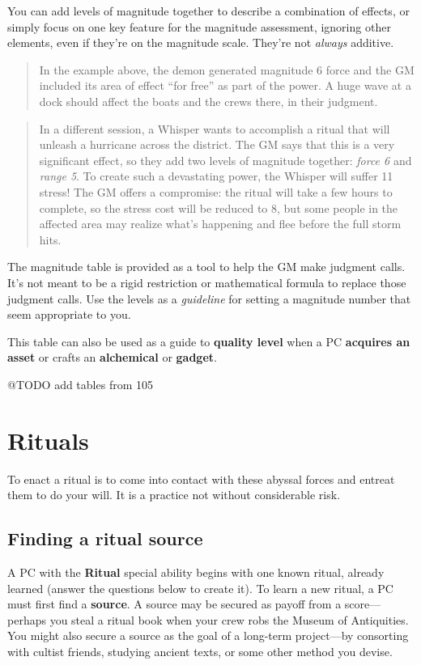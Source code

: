 \documentclass[11pt,oneside]{book}
\newcommand{\gameterm}[1]{\textbf{#1}}
\begin{document}
You can add levels of magnitude together to describe a combination of effects, or simply focus on one key feature for the magnitude assessment, ignoring other elements, even if they’re on the magnitude scale. They’re not \emph{always} additive.

\begin{quote}
	In the example above, the demon generated magnitude 6 force and the GM included its area of effect “for free” as part of the power. A huge wave at a dock should affect the boats and the crews there, in their judgment.
\end{quote} 

\begin{quote}
	In a different session, a Whisper wants to accomplish a ritual that will unleash a hurricane across the district. The GM says that this is a very significant effect, so they add two levels of magnitude together: \emph{force 6} and \emph{range 5}. To create such a devastating power, the Whisper will suffer 11 stress! The GM offers a compromise: the ritual will take a few hours to complete, so the stress cost will be reduced to 8, but some people in the affected area may realize what’s happening and flee before the full storm hits.
\end{quote} 

The magnitude table is provided as a tool to help the GM make judgment calls. It’s not meant to be a rigid restriction or mathematical formula to replace those judgment calls. Use the levels as a \emph{guideline} for setting a magnitude number that seem appropriate to you.

This table can also be used as a guide to \textbf{quality level} when a PC \textbf{acquires an asset }or crafts an \textbf{alchemical} or \textbf{gadget}.

@TODO add tables from 105

\chapter{Rituals}

To enact a ritual is to come into contact with these abyssal forces and entreat them to do your will. It is a practice not without considerable risk.

\section{Finding a ritual source}

A PC with the \gameterm{Ritual}  special ability begins with one known ritual, already learned (answer the questions below to create it). To learn a new ritual, a PC must first find a \textbf{source}. A source may be secured as payoff from a score---perhaps you steal a ritual book when your crew robs the Museum of Antiquities. You might also secure a source as the goal of a long-term project---by consorting with cultist friends, studying ancient texts, or some other method you devise.
\end{document}
